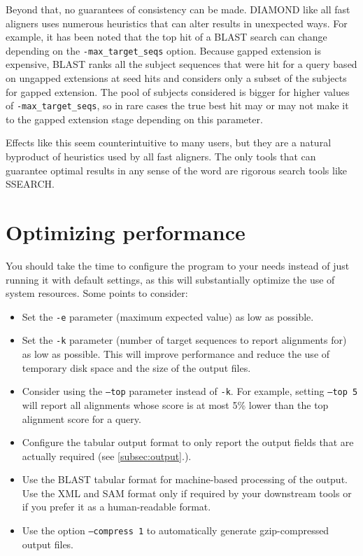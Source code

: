 \documentclass[11pt]{article}
\newenvironment{QandA}{\begin{enumerate}}
                      {\end{enumerate}}
\newenvironment{answered}{\par\normalfont}{}
\begin{document}
\begin{QandA}
\begin{answered}
Beyond that, no guarantees of consistency can be made. DIAMOND like all fast aligners uses numerous heuristics that can alter results in unexpected ways. For example, it has been noted that the top hit of a BLAST search can change depending on the \texttt{-max\_target\_seqs} option. Because gapped extension is expensive, BLAST ranks all the subject sequences that were hit for a query based on ungapped extensions at seed hits and considers only a subset of the subjects for gapped extension. The pool of subjects considered is bigger for higher values of \texttt{-max\_target\_seqs}, so in rare cases the true best hit may or may not make it to the gapped extension stage depending on this parameter.

Effects like this seem counterintuitive to many users, but they are a natural byproduct of heuristics used by all fast aligners. The only tools that can guarantee optimal results in any sense of the word are rigorous search tools like SSEARCH.
\end{answered}

\end{QandA}

\section{Optimizing performance}
You should take the time to configure the program to your needs instead of just running it with default settings, as this will substantially optimize the use of system resources. Some points to consider:
\begin{itemize}
\item
Set the \texttt{-e} parameter (maximum expected value) as low as possible.
\item
Set the \texttt{-k} parameter (number of target sequences to report alignments for) as low as possible. This will improve performance and reduce the use of temporary disk space and the size of the output files.
\item
Consider using the \texttt{--top} parameter instead of \texttt{-k}. For example, setting \texttt{--top 5} will report all alignments whose score is at most 5\% lower than the top alignment score for a query.
\item
Configure the tabular output format to only report the output fields that are actually required (see \ref{subsec:output}.).
\item
Use the BLAST tabular format for machine-based processing of the output. Use the XML and SAM format only if required by your downstream tools or if you prefer it as a human-readable format.
\item
Use the option \texttt{--compress 1} to automatically generate gzip-compressed output files.
\end{itemize}
\end{document}
